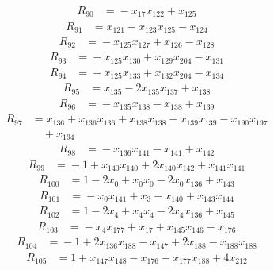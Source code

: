 \begin{align*}
R_{90}&={}-x_{17}x_{122} +x_{125}
\end{align*}
\begin{align*}
R_{91}&={}x_{121} -x_{123}x_{125} -x_{124}
\end{align*}
\begin{align*}
R_{92}&={}-x_{125}x_{127} +x_{126} -x_{128}
\end{align*}
\begin{align*}
R_{93}&={}-x_{125}x_{130} +x_{129}x_{204} -x_{131}
\end{align*}
\begin{align*}
R_{94}&={}-x_{125}x_{133} +x_{132}x_{204} -x_{134}
\end{align*}
\begin{align*}
R_{95}&={}x_{135} -2x_{135}x_{137} +x_{138}
\end{align*}
\begin{align*}
R_{96}&={}-x_{135}x_{138} -x_{138} +x_{139}
\end{align*}
\begin{align*}
R_{97}&={}x_{136} +x_{136}x_{136} +x_{138}x_{138} -x_{139}x_{139} -x_{190}x_{197}\\
&\quad{}+x_{194}
\end{align*}
\begin{align*}
R_{98}&={}-x_{136}x_{141} -x_{141} +x_{142}
\end{align*}
\begin{align*}
R_{99}&={}-1 +x_{140}x_{140} +2x_{140}x_{142} +x_{141}x_{141}
\end{align*}
\begin{align*}
R_{100}&={}1 -2x_{0} +x_{0}x_{0} -2x_{0}x_{136} +x_{143}
\end{align*}
\begin{align*}
R_{101}&={}-x_{0}x_{141} +x_{3} -x_{140} +x_{143}x_{144}
\end{align*}
\begin{align*}
R_{102}&={}1 -2x_{4} +x_{4}x_{4} -2x_{4}x_{136} +x_{145}
\end{align*}
\begin{align*}
R_{103}&={}-x_{4}x_{177} +x_{17} +x_{145}x_{146} -x_{176}
\end{align*}
\begin{align*}
R_{104}&={}-1 +2x_{136}x_{188} -x_{147} +2x_{188} -x_{188}x_{188}
\end{align*}
\begin{align*}
R_{105}&={}1 +x_{147}x_{148} -x_{176} -x_{177}x_{188} +4x_{212}
\end{align*}
